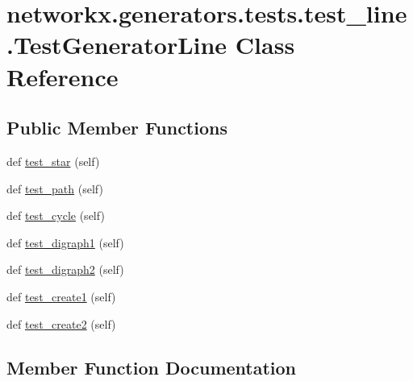 \hypertarget{classnetworkx_1_1generators_1_1tests_1_1test__line_1_1TestGeneratorLine}{}\section{networkx.\+generators.\+tests.\+test\+\_\+line.\+Test\+Generator\+Line Class Reference}
\label{classnetworkx_1_1generators_1_1tests_1_1test__line_1_1TestGeneratorLine}
\subsection*{Public Member Functions}
\begin{DoxyCompactItemize}
\item 
def \hyperlink{classnetworkx_1_1generators_1_1tests_1_1test__line_1_1TestGeneratorLine_aa7de4e08b2c4ec3cd3b2182617e85d07}{test\+\_\+star} (self)
\item 
def \hyperlink{classnetworkx_1_1generators_1_1tests_1_1test__line_1_1TestGeneratorLine_a288395a24d5afbd6ffa3a074da377dda}{test\+\_\+path} (self)
\item 
def \hyperlink{classnetworkx_1_1generators_1_1tests_1_1test__line_1_1TestGeneratorLine_a30a620849fe1d6f2790df2f6e5540777}{test\+\_\+cycle} (self)
\item 
def \hyperlink{classnetworkx_1_1generators_1_1tests_1_1test__line_1_1TestGeneratorLine_a9f10434e51c604198821092ca71fb108}{test\+\_\+digraph1} (self)
\item 
def \hyperlink{classnetworkx_1_1generators_1_1tests_1_1test__line_1_1TestGeneratorLine_a7cb0c46ec86c991641091ca515ba127d}{test\+\_\+digraph2} (self)
\item 
def \hyperlink{classnetworkx_1_1generators_1_1tests_1_1test__line_1_1TestGeneratorLine_a0bf2d1b1bbf4258cbdb93406f4fcf39f}{test\+\_\+create1} (self)
\item 
def \hyperlink{classnetworkx_1_1generators_1_1tests_1_1test__line_1_1TestGeneratorLine_a3f756c790dddf00b30af029dbf46dff6}{test\+\_\+create2} (self)
\end{DoxyCompactItemize}


\subsection{Member Function Documentation}
\mbox{\label{classnetworkx_1_1generators_1_1tests_1_1test__line_1_1TestGeneratorLine_a0bf2d1b1bbf4258cbdb93406f4fcf39f}} 
